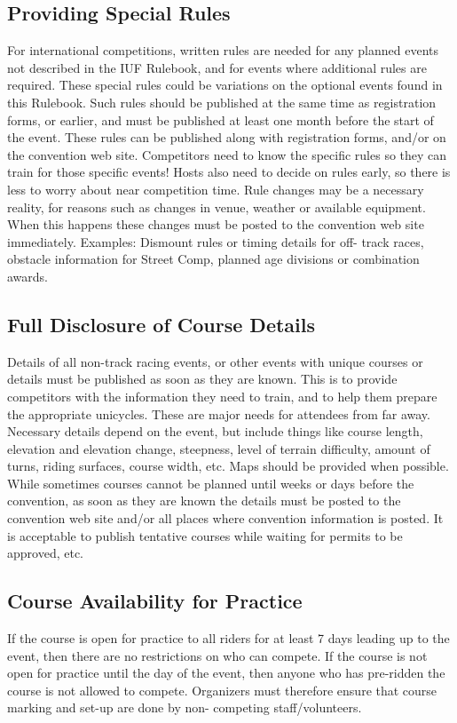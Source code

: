 \subsection{Providing Special Rules}
For international competitions, written rules are needed for any planned events not described in the IUF Rulebook, and for events where additional rules are required. 
These special rules could be variations on the optional events found in this Rulebook. 
Such rules should be published at the same time as registration forms, or earlier, and must be published at least one month before the start of the event. 
These rules can be published along with registration forms, and/or on the convention web site. 
Competitors need to know the specific rules so they can train for those specific events! 
Hosts also need to decide on rules early, so there is less to worry about near competition time. 
Rule changes may be a necessary reality, for reasons such as changes in venue, weather or available equipment. 
When this happens these changes must be posted to the convention web site immediately. 
Examples: Dismount rules or timing details for off- track races, obstacle information for Street Comp, planned age divisions or combination awards.

\subsection{Full Disclosure of Course Details}
Details of all non-track racing events, or other events with unique courses or details must be published as soon as they are known. 
This is to provide competitors with the information they need to train, and to help them prepare the appropriate unicycles.
These are major needs for attendees from far away. 
Necessary details depend on the event, but include things like course length, elevation and elevation change, steepness, level of terrain difficulty, amount of turns, riding surfaces, course width, etc.
Maps should be provided when possible. 
While sometimes courses cannot be planned until weeks or days before the convention, as soon as they are known the details must be posted to the convention web site and/or all places where convention information is posted. 
It is acceptable to publish tentative courses while waiting for permits to be approved, etc.

\subsection{Course Availability for Practice}
If the course is open for practice to all riders for at least 7 days leading up to the event, then there are no restrictions on who can compete. 
If the course is not open for practice until the day of the event, then anyone who has pre-ridden the course is not allowed to compete. 
Organizers must therefore ensure that course marking and set-up are done by non- competing staff/volunteers.

